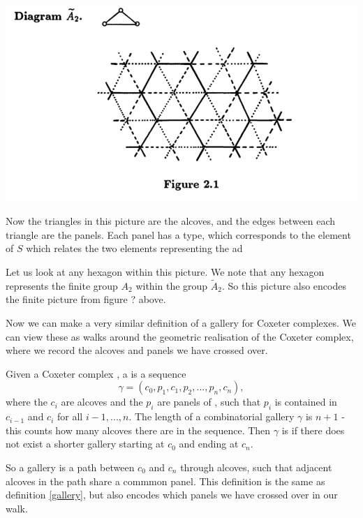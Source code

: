 \documentclass[11pt]{article}
\begin{document}
\begin{center}
    \includegraphics[scale=0.6]{Screenshot 2023-02-20 at 14.12.15.1.png}\\
\end{center}

Now the triangles in this picture are the alcoves, and the edges between each triangle are the panels. Each panel has a type, which corresponds to the element of $S$ which relates the two elements representing the ad

Let us look at any hexagon within this picture. We note that any hexagon represents the finite group $A_2$ within the group $\tilde{A}_2$. So this picture also encodes the finite picture from figure ? above. 


Now we can make a very similar definition of a gallery for Coxeter complexes. We can view these as walks around the geometric realisation of the Coxeter complex, where we record the alcoves and panels we have crossed over. 

\begin{definition}\label{comb.gallery}
    Given a Coxeter complex \sg, a  is a sequence
    \[\gamma = (c_0,p_1,c_1,p_2,...,p_n,c_n),\]
    where the $c_i$ are alcoves and the $p_i$ are panels of \sg, such that $p_i$ is contained in $c_{i-1}$ and $c_{i}$ for all $i-1,...,n$. The length of a combinatorial gallery $\gamma$ is $n+1$ - this counts how many alcoves there are in the sequence. Then $\gamma$ is  if there does not exist a shorter gallery starting at $c_0$ and ending at $c_n$. 
\end{definition}

So a gallery is a path between $c_0$ and $c_n$ through alcoves, such that adjacent alcoves in the path share a commmon panel. This definition is the same as definition \ref{gallery}, but also encodes which panels we have crossed over in our walk. 
\end{document}
